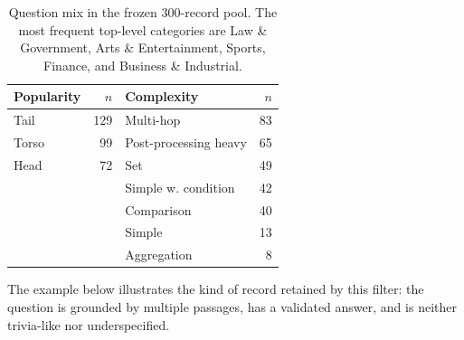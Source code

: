 \begin{table}[H]
\centering
\scriptsize
\begin{tabularx}{\linewidth}{@{}Y r Y r@{}}
\toprule
Popularity & $n$ & Complexity & $n$ \\
\midrule
Tail & 129 & Multi-hop & 83 \\
Torso & 99 & Post-processing heavy & 65 \\
Head & 72 & Set & 49 \\
 & & Simple w. condition & 42 \\
 & & Comparison & 40 \\
 & & Simple & 13 \\
 & & Aggregation & 8 \\
\bottomrule
\end{tabularx}
\caption{Question mix in the frozen 300-record pool. The most frequent top-level categories are Law \& Government, Arts \& Entertainment, Sports, Finance, and Business \& Industrial.}
\label{tab:dataset-mix}
\end{table}

The example below illustrates the kind of record retained by this filter: the question is grounded by multiple passages, has a validated answer, and is neither trivia-like nor underspecified.

\begin{center}
\setlength{\fboxsep}{2.5pt}
\end{center}

\FloatBarrier

